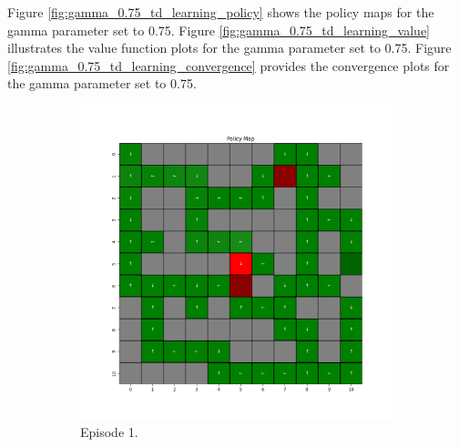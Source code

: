 \documentclass{assignment}
\begin{document}
Figure \ref{fig:gamma_0.75_td_learning_policy} shows the policy maps for the gamma parameter set to 0.75. Figure \ref{fig:gamma_0.75_td_learning_value} illustrates the value function plots for the gamma parameter set to 0.75. Figure \ref{fig:gamma_0.75_td_learning_convergence} provides the convergence plots for the gamma parameter set to 0.75.


\begin{figure}[H]
    \begin{subfigure}{0.3\textwidth}
        \includegraphics[width=\textwidth]{figures/policy_td/gamma_sweep/policy_alpha_0.1_gamma_0.75_epsilon_0.2_iteration_1.png}
    \caption{Episode 1.}
    \end{subfigure}\hfill
    \begin{subfigure}{0.3\textwidth}

\end{subfigure}
\end{figure}
\end{document}
